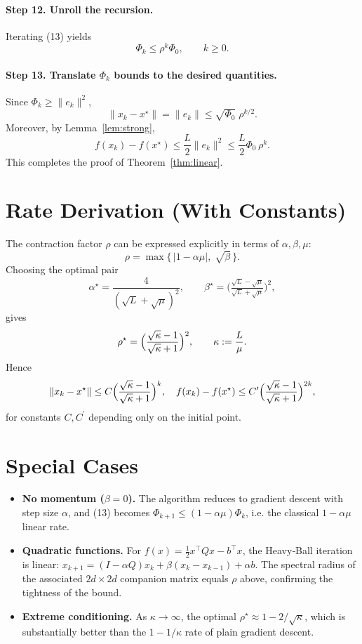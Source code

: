 \documentclass{article}
\begin{document}
\paragraph{Step 12. Unroll the recursion.}
Iterating (13) yields
\[
\Phi_{k}\le \rho^{k}\Phi_{0},\qquad k\ge0. \tag{15}
\]

\paragraph{Step 13. Translate $\Phi_{k}$ bounds to the desired quantities.}
Since $\Phi_{k}\ge\|e_{k}\|^{2}$,
\[
\|x_{k}-x^{\star}\|=\|e_{k}\|\le \sqrt{\Phi_{0}}\;\rho^{k/2}. \tag{16}
\]
Moreover, by Lemma~\ref{lem:strong},
\[
f(x_{k})-f(x^{\star})\le\frac{L}{2}\|e_{k}\|^{2}
                     \le\frac{L}{2}\Phi_{0}\,\rho^{k}. \tag{17}
\]
This completes the proof of Theorem~\ref{thm:linear}. \hfill\qedsymbol

\section*{Rate Derivation (With Constants)}
The contraction factor $\rho$ can be expressed explicitly in terms of $\alpha,\beta,\mu$:
\[
\rho=\max\bigl\{\,|1-\alpha\mu|,\;\sqrt{\beta}\,\bigr\}.
\]
Choosing the optimal pair
\[
\alpha^{\star}= \frac{4}{(\sqrt{L}+\sqrt{\mu})^{2}},\qquad
\beta^{\star}= \bigl(\tfrac{\sqrt{L}-\sqrt{\mu}}{\sqrt{L}+\sqrt{\mu}}\bigr)^{2},
\]
gives
\[
\rho^{\star}= \Bigl(\frac{\sqrt{\kappa}-1}{\sqrt{\kappa}+1}\Bigr)^{2},
\qquad\kappa:=\frac{L}{\mu}.
\]
Hence
\[
\|x_{k}-x^{\star}\|\le C\Bigl(\frac{\sqrt{\kappa}-1}{\sqrt{\kappa}+1}\Bigr)^{k},
\quad
f(x_{k})-f(x^{\star})\le C^{\prime}\Bigl(\frac{\sqrt{\kappa}-1}{\sqrt{\kappa}+1}\Bigr)^{2k},
\]
for constants $C,C^{\prime}$ depending only on the initial point.

\section*{Special Cases}
\begin{itemize}
\item \textbf{No momentum ($\beta=0$).}  The algorithm reduces to gradient descent with step size $\alpha$, and (13) becomes $\Phi_{k+1}\le(1-\alpha\mu)\Phi_{k}$, i.e. the classical $1-\alpha\mu$ linear rate.
\item \textbf{Quadratic functions.}  For $f(x)=\tfrac12 x^{\top}Qx-b^{\top}x$, the Heavy‑Ball iteration is linear: $x_{k+1}= (I-\alpha Q)x_{k}+\beta(x_{k}-x_{k-1})+ \alpha b$.  The spectral radius of the associated $2d\times2d$ companion matrix equals $\rho$ above, confirming the tightness of the bound.
\item \textbf{Extreme conditioning.}  As $\kappa\to\infty$, the optimal $\rho^{\star}\approx 1-2/\sqrt{\kappa}$, which is substantially better than the $1-1/\kappa$ rate of plain gradient descent.
\end{itemize}
\end{document}
